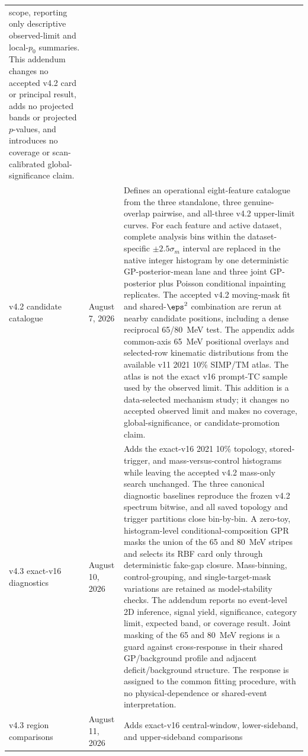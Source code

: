 \begin{longtable}{P{0.11\textwidth}P{0.16\textwidth}P{0.64\textwidth}}
scope, reporting only descriptive observed-limit and local-$p_0$ summaries.
This addendum changes no accepted v4.2 card or principal result, adds no
projected bands or projected $p$-values, and introduces no coverage or
scan-calibrated global-significance claim. \\
\addlinespace
v4.2 candidate catalogue & August 7, 2026 &
Defines an operational eight-feature catalogue from the three standalone,
three genuine-overlap pairwise, and all-three v4.2 upper-limit curves.  For
each feature and active dataset, complete analysis bins within the
dataset-specific $\pm2.5\sigma_m$ interval are replaced in the native integer
histogram by one deterministic GP-posterior-mean lane and three joint
GP-posterior plus Poisson conditional inpainting replicates.  The accepted
v4.2 moving-mask fit and shared-$\eps^2$ combination are rerun at nearby
candidate positions, including a dense reciprocal 65/80~MeV test.  The
appendix adds common-axis 65~MeV positional overlays and selected-row
kinematic distributions from the available v11 2021 10\% SIMP/TM atlas.  The
atlas is not the exact v16 prompt-TC sample used by the observed limit.  This
addition is a data-selected mechanism study; it changes no accepted observed
limit and makes no coverage, global-significance, or candidate-promotion
claim. \\
\addlinespace
v4.3 exact-v16 diagnostics & August 10, 2026 &
Adds the exact-v16 2021 10\% topology, stored-trigger, and mass-versus-control
histograms while leaving the accepted v4.2 mass-only search unchanged.  The
three canonical diagnostic baselines reproduce the frozen v4.2 spectrum
bitwise, and all saved topology and trigger partitions close bin-by-bin.  A
zero-toy, histogram-level conditional-composition GPR masks the union of the
65 and 80~MeV stripes and selects its RBF card only through deterministic
fake-gap closure.  Mass-binning, control-grouping, and single-target-mask
variations are retained as model-stability checks.  The addendum reports no
event-level 2D inference, signal yield, significance, category limit,
expected band, or coverage result.  Joint masking of the 65 and 80~MeV
regions is a guard against cross-response in their shared GP/background
profile and adjacent deficit/background structure.  The response is assigned
to the common fitting procedure, with no physical-dependence or shared-event
interpretation. \\
\addlinespace
v4.3 region comparisons & August 11, 2026 &
Adds exact-v16 central-window, lower-sideband, and upper-sideband comparisons

\end{longtable}
